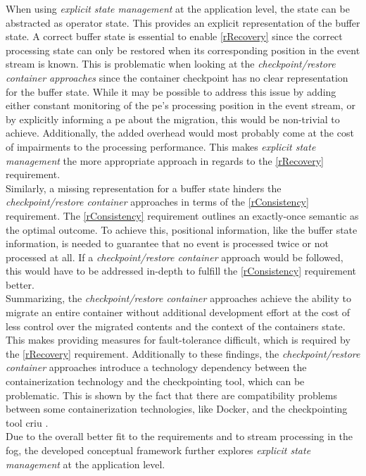 When using \textit{explicit state management} at the application level, the state can be abstracted as operator state. This provides an explicit representation of the buffer state. A correct buffer state is essential to enable \ref{rRecovery} since the correct processing state can only be restored when its corresponding position in the event stream is known. This is problematic when looking at the \textit{checkpoint/restore container approaches} since the container checkpoint has no clear representation for the buffer state. While it may be possible to address this issue by adding either constant monitoring of the \gls{pe}'s processing position in the event stream, or by explicitly informing a \gls{pe} about the migration, this would be non-trivial to achieve. Additionally, the added overhead would most probably come at the cost of impairments to the processing performance. This makes \textit{explicit state management} the more appropriate approach in regards to the \ref{rRecovery} requirement.\\
Similarly, a missing representation for a buffer state hinders the \textit{checkpoint/restore container} approaches in terms of the \ref{rConsistency} requirement. The \ref{rConsistency} requirement outlines an exactly-once semantic as the optimal outcome. To achieve this, positional information, like the buffer state information, is needed to guarantee that no event is processed twice or not processed at all. If a \textit{checkpoint/restore container} approach would be followed, this would have to be addressed in-depth to fulfill the \ref{rConsistency} requirement better.\\
Summarizing, the \textit{checkpoint/restore container} approaches achieve the ability to migrate an entire container without additional development effort at the cost of less control over the migrated contents and the context of the containers state. This makes providing measures for fault-tolerance difficult, which is required by the \ref{rRecovery} requirement. Additionally to these findings, the \textit{checkpoint/restore container} approaches introduce a technology dependency between the containerization technology and the checkpointing tool, which can be problematic. This is shown by the fact that there are compatibility problems between some containerization technologies, like Docker, and the checkpointing tool \gls{criu} \cite{Brogi.2018, .27032020}.\\
Due to the overall better fit to the requirements and to stream processing in the fog, the developed conceptual framework further explores \textit{explicit state management} at the application level.\par


